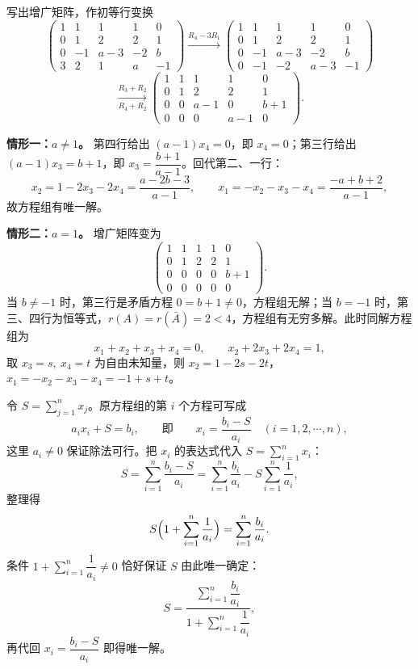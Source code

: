 \begin{solution}
写出增广矩阵，作初等行变换
\[
\left(\begin{array}{cccc|c}
1&1&1&1&0\\
0&1&2&2&1\\
0&-1&a-3&-2&b\\
3&2&1&a&-1
\end{array}\right)
\xrightarrow{R_4-3R_1}
\left(\begin{array}{cccc|c}
1&1&1&1&0\\
0&1&2&2&1\\
0&-1&a-3&-2&b\\
0&-1&-2&a-3&-1
\end{array}\right)
\]
\[
\xrightarrow[R_4+R_2]{R_3+R_2}
\left(\begin{array}{cccc|c}
1&1&1&1&0\\
0&1&2&2&1\\
0&0&a-1&0&b+1\\
0&0&0&a-1&0
\end{array}\right).
\]

\textbf{情形一：$a\ne1$。} 第四行给出 $(a-1)x_4=0$，即 $x_4=0$；第三行给出 $(a-1)x_3=b+1$，即 $x_3=\dfrac{b+1}{a-1}$。回代第二、一行：
\[
x_2=1-2x_3-2x_4=\frac{a-2b-3}{a-1},\qquad
x_1=-x_2-x_3-x_4=\frac{-a+b+2}{a-1},
\]
故方程组有唯一解。

\textbf{情形二：$a=1$。} 增广矩阵变为
\[
\left(\begin{array}{cccc|c}
1&1&1&1&0\\
0&1&2&2&1\\
0&0&0&0&b+1\\
0&0&0&0&0
\end{array}\right).
\]
当 $b\ne-1$ 时，第三行是矛盾方程 $0=b+1\ne0$，方程组无解；当 $b=-1$ 时，第三、四行为恒等式，$r(A)=r(\bar A)=2<4$，方程组有无穷多解。此时同解方程组为
\[
x_1+x_2+x_3+x_4=0,\qquad x_2+2x_3+2x_4=1,
\]
取 $x_3=s,\ x_4=t$ 为自由未知量，则 $x_2=1-2s-2t$，$x_1=-x_2-x_3-x_4=-1+s+t$。
\end{solution}

\begin{solution}
令 $S=\sum\limits_{j=1}^{n}x_j$。原方程组的第 $i$ 个方程可写成
\[
a_ix_i+S=b_i,\qquad\text{即}\qquad x_i=\frac{b_i-S}{a_i}\quad(i=1,2,\cdots,n),
\]
这里 $a_i\ne0$ 保证除法可行。把 $x_i$ 的表达式代入 $S=\sum\limits_{i=1}^{n}x_i$：
\[
S=\sum_{i=1}^{n}\frac{b_i-S}{a_i}=\sum_{i=1}^{n}\frac{b_i}{a_i}-S\sum_{i=1}^{n}\frac1{a_i},
\]
整理得
\[
S\Bigl(1+\sum_{i=1}^{n}\frac1{a_i}\Bigr)=\sum_{i=1}^{n}\frac{b_i}{a_i}.
\]
条件 $1+\sum\limits_{i=1}^{n}\dfrac1{a_i}\ne0$ 恰好保证 $S$ 由此唯一确定：
\[
S=\frac{\sum_{i=1}^{n}\dfrac{b_i}{a_i}}{1+\sum_{i=1}^{n}\dfrac1{a_i}},
\]
再代回 $x_i=\dfrac{b_i-S}{a_i}$ 即得唯一解。
\end{solution}

